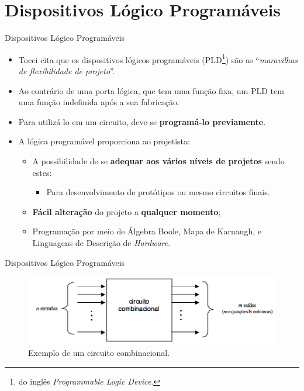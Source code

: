 \documentclass[aspectratio=169]{beamer}
\begin{document}
\section{Dispositivos Lógico Programáveis}
	\begin{frame}{Dispositivos Lógico Programáveis}
		\begin{itemize}
			\setlength\itemsep{1em}
			
			\item Tocci \cite{Tocci2003} cita que os dispositivos lógicos programáveis (PLD\footnote{do inglês \textit{Programmable Logic Device}.}) são as ``\textit{maravilhas de flexibilidade de projeto}''.
			
			\item Ao contrário de uma porta lógica, que tem uma função fixa, um PLD tem uma função indefinida após a sua fabricação. 
			
			\item Para utilizá-lo em um circuito, deve-se \textbf{programá-lo previamente}.
			
			\item A lógica programável proporciona ao projetista:
			\begin{itemize}
				\setlength\itemsep{0.3em}
				\item A possibilidade de se \textbf{adequar aos vários níveis de projetos} sendo estes:
				\begin{itemize}
					\item Para desenvolvimento de protótipos ou mesmo circuitos finais.
				\end{itemize}
				
				\item \textbf{Fácil alteração} do projeto a \textbf{qualquer momento};
				
				\item Programação por meio de Álgebra Boole, Mapa de Karnaugh, e Linguagens de Descrição de \textit{Hardware}.
			\end{itemize}
		\end{itemize}
	\end{frame}
	
	\begin{frame}{Dispositivos Lógico Programáveis}
		\begin{figure}[H]
			\centering
			\includegraphics[width=1\textwidth]{img/fpga/geral1.png}
			\caption{Exemplo de um circuito combinacional.}
		\end{figure}
	\end{frame}
	
\end{document}
